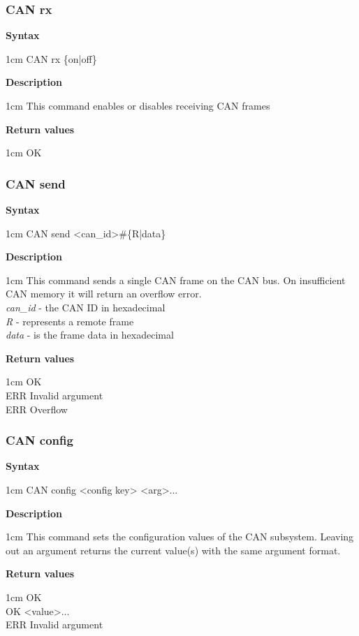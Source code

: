 \documentclass{article}[a4paper]
\begin{document}
\subsubsection{CAN rx}
\begin{tcolorbox}
	{\bf Syntax}

	 1cm \dimexpr\linewidth-2cm\relax
	CAN rx \{on|off\}

	\medskip
	{\bf Description}

	 1cm \dimexpr\linewidth-2cm\relax
	This command enables or disables receiving CAN frames

	\medskip
	{\bf Return values}

	 1cm \dimexpr\linewidth-2cm\relax
	OK
\end{tcolorbox}

\subsubsection{CAN send}
\begin{tcolorbox}
	{\bf Syntax}

	 1cm \dimexpr\linewidth-2cm\relax
	CAN send <can\_id>\#\{R|data\}

	\medskip
	{\bf Description}

	 1cm \dimexpr\linewidth-2cm\relax
	This command sends a single CAN frame on the CAN bus. On insufficient CAN
	memory it will return an overflow error.
	\medskip \\
	{\it can\_id} - the CAN ID in hexadecimal \\
	{\it R} - represents a remote frame \\
	{\it data} - is the frame data in hexadecimal

	\medskip
	{\bf Return values}

	 1cm \dimexpr\linewidth-2cm\relax
	OK \\
	ERR Invalid argument \\
	ERR Overflow
\end{tcolorbox}

\subsubsection{CAN config}
\begin{tcolorbox}
	{\bf Syntax}

	 1cm \dimexpr\linewidth-2cm\relax
	CAN config <config key> <arg>...

	\medskip
	{\bf Description}

	 1cm \dimexpr\linewidth-2cm\relax
	This command sets the configuration values of the CAN subsystem.
	Leaving out an argument returns the current value(s) with the same argument
	format.

	\medskip
	{\bf Return values}

	 1cm \dimexpr\linewidth-2cm\relax
	OK \\
	OK <value>... \\
	ERR Invalid argument
\end{tcolorbox}
\end{document}
